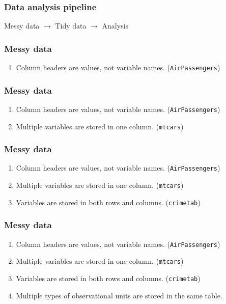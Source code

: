 \documentclass{beamer}
\begin{document}
\begin{frame}
	\frametitle{Data analysis pipeline}
	\begin{center}
		Messy data $\rightarrow$ Tidy data $\rightarrow$ Analysis
	\end{center}
\end{frame}

\begin{frame}
	\frametitle{Messy data}
	\begin{center}
		\begin{enumerate}
			\item Column headers are values, not variable names. 
			(\texttt{AirPassengers})
		\end{enumerate}
	\end{center}
\end{frame}

\begin{frame}
	\frametitle{Messy data}
	\begin{center}
		\begin{enumerate}
			\item Column headers are values, not variable names. 
			(\texttt{AirPassengers})
			\item Multiple variables are stored in one column. (\texttt{mtcars})
		\end{enumerate}
	\end{center}
\end{frame}

\begin{frame}
	\frametitle{Messy data}
	\begin{center}
		\begin{enumerate}
			\item Column headers are values, not variable names. 
			(\texttt{AirPassengers})
			\item Multiple variables are stored in one column. (\texttt{mtcars})
			\item Variables are stored in both rows and columns. 
			(\texttt{crimetab})
		\end{enumerate}
	\end{center}
\end{frame}


\begin{frame}
	\frametitle{Messy data}
	\begin{center}
		\begin{enumerate}
			\item Column headers are values, not variable names. 
			(\texttt{AirPassengers})
			\item Multiple variables are stored in one column. (\texttt{mtcars})
			\item Variables are stored in both rows and columns. 
			(\texttt{crimetab})
			\item Multiple types of observational units are stored in the same 
			table.
		\end{enumerate}
	\end{center}
\end{frame}
\end{document}

